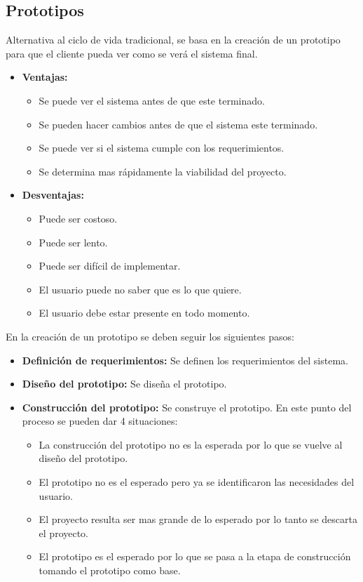\documentclass{templateNote}
\begin{document}
\subsection{Prototipos}
\noindent Alternativa al ciclo de vida tradicional, se basa en la creación de un prototipo para que el cliente pueda ver como se verá el sistema final.
\begin{itemize}
    \item \textbf{Ventajas:}
    \begin{itemize}
        \item Se puede ver el sistema antes de que este terminado.
        \item Se pueden hacer cambios antes de que el sistema este terminado.
        \item Se puede ver si el sistema cumple con los requerimientos.
        \item Se determina mas rápidamente la viabilidad del proyecto.
    \end{itemize}
    \item \textbf{Desventajas:}
    \begin{itemize}
        \item Puede ser costoso.
        \item Puede ser lento.
        \item Puede ser difícil de implementar.
        \item El usuario puede no saber que es lo que quiere.
        \item El usuario debe estar presente en todo momento.
    \end{itemize}
\end{itemize}
\noindent En la creación de un prototipo se deben seguir los siguientes pasos:
\begin{itemize}
    \item \textbf{Definición de requerimientos:} Se definen los requerimientos del sistema.
    \item \textbf{Diseño del prototipo:} Se diseña el prototipo.
    \item \textbf{Construcción del prototipo:} Se construye el prototipo.
    En este punto del proceso se pueden dar 4 situaciones:
    \begin{itemize}
        \item La construcción del prototipo no es la esperada por lo que se vuelve al diseño del prototipo.
        \item El prototipo no es el esperado pero ya se identificaron las necesidades del usuario.
        \item El proyecto resulta ser mas grande de lo esperado por lo tanto se descarta el proyecto.
        \item El prototipo es el esperado por lo que se pasa a la etapa de construcción tomando el prototipo como base.
    \end{itemize}
\end{itemize}
\end{document}

